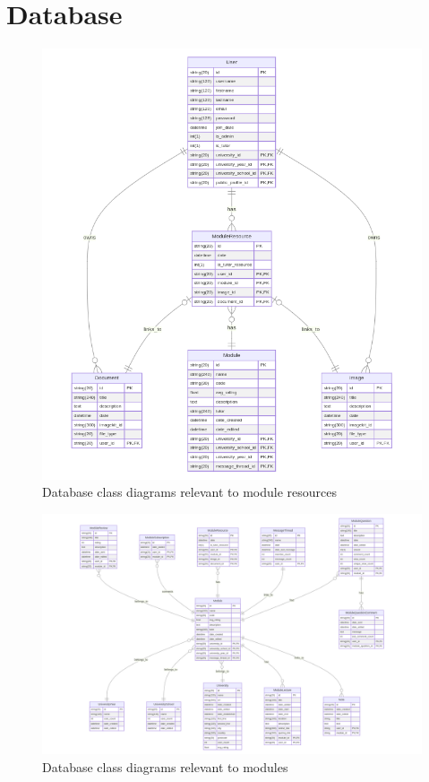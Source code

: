 \section{Database}

\begin{figure}[H]
\centering
\includegraphics[scale=0.35]{images/database/db_module_resource.png}
\caption{Database class diagrams relevant to module resources}
\label{fig:figure2}
\end{figure}

\begin{figure}[H]
\centering
\includegraphics[scale=0.35]{images/database/db_module.png}
\caption{Database class diagrams relevant to modules}
\label{fig:figure2}
\end{figure}

